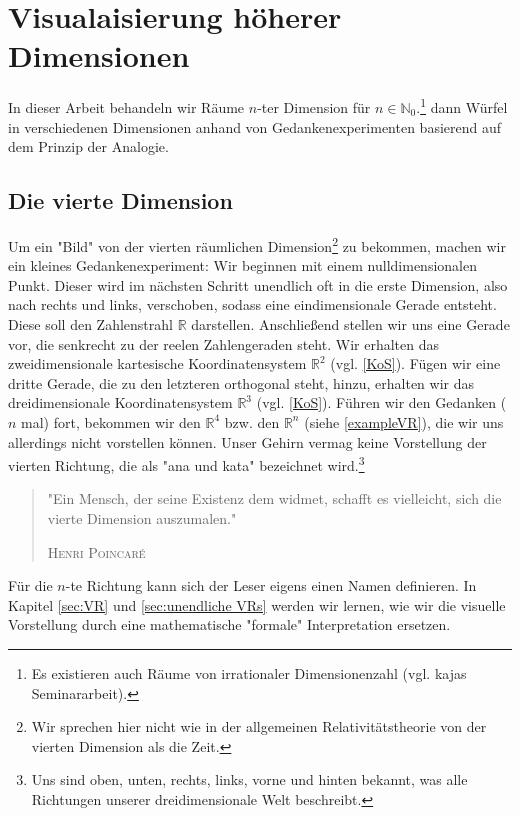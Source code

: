 \chapter{Visualaisierung höherer Dimensionen}
\label{sec:Visualisierung}

In dieser Arbeit behandeln wir Räume $n$-ter Dimension für $n \in \mathbb{N}_{0}$.\footnote{Es existieren auch Räume von irrationaler Dimensionenzahl (vgl. kajas Seminararbeit).}  dann Würfel in verschiedenen Dimensionen anhand von Gedankenexperimenten basierend auf dem Prinzip der Analogie.

\section{Die vierte Dimension}

Um ein "Bild" von der vierten räumlichen Dimension\footnote{Wir sprechen hier nicht wie in der allgemeinen Relativitätstheorie von der vierten Dimension als die Zeit.} zu bekommen, machen wir ein kleines Gedankenexperiment: Wir beginnen mit einem nulldimensionalen Punkt. Dieser wird im nächsten Schritt unendlich oft in die erste Dimension, also nach rechts und links, verschoben, sodass eine eindimensionale Gerade entsteht. Diese soll den Zahlenstrahl $\mathbb{R}$ darstellen. Anschließend stellen wir uns eine Gerade vor, die senkrecht zu der reelen Zahlengeraden steht. Wir erhalten das zweidimensionale kartesische Koordinatensystem $\mathbb{R}^2$ (vgl. \ref{KoS}). Fügen wir eine dritte  Gerade, die zu den letzteren orthogonal steht, hinzu, erhalten wir das dreidimensionale Koordinatensystem $\mathbb{R}^3$ (vgl. \ref{KoS}). Führen wir den Gedanken ($n$ mal) fort, bekommen wir den $\mathbb{R}^4$ bzw. den $\mathbb{R}^n$ (siehe \ref{exampleVR}), die wir uns allerdings nicht vorstellen können. Unser Gehirn vermag keine Vorstellung der vierten Richtung, die als "ana und kata" bezeichnet wird.\footnote{Uns sind oben, unten, rechts, links, vorne und hinten bekannt, was alle Richtungen unserer dreidimensionale Welt beschreibt.}   %
\begin{quote}
"Ein Mensch, der seine Existenz dem widmet, schafft es vielleicht, sich die vierte Dimension auszumalen."
\begin{flushright}
\textsc{Henri Poincaré}
\end{flushright}
\end{quote}
Für die $n$-te Richtung kann sich der Leser eigens einen Namen definieren. In Kapitel \ref{sec:VR} und \ref{sec:unendliche VRs} werden wir lernen, wie wir die visuelle Vorstellung durch eine mathematische "formale" Interpretation ersetzen.

